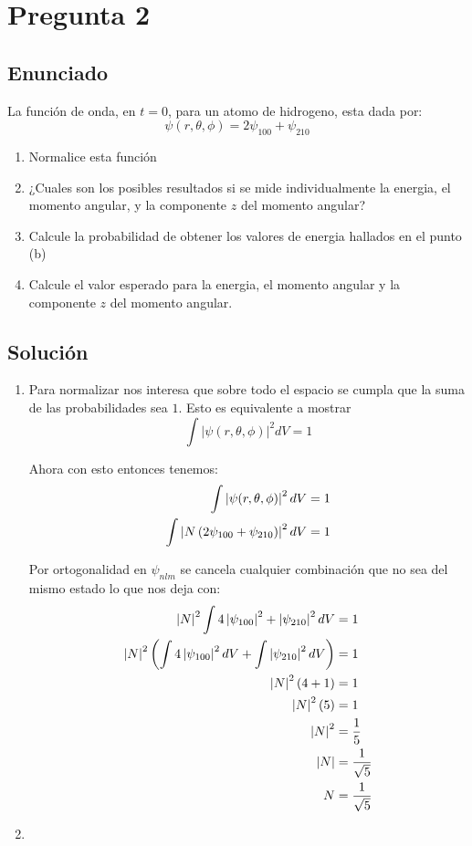 \documentclass[12pt]{exam}
\begin{document}
\section{Pregunta 2}

\subsection{Enunciado}
La función de onda, en $t = 0$, para un atomo de hidrogeno, esta dada por:
\begin{equation}
	\psi(r, \theta, \phi) = 2\psi_{100} + \psi_{210}
\end{equation}
\begin{enumerate}
	\item Normalice esta función
	\item ¿Cuales son los posibles resultados si se mide individualmente la energia, el momento angular, y la componente $z$ del momento angular?
	\item Calcule la probabilidad de obtener los valores de energia hallados en el punto (b)
	\item Calcule el valor esperado para la energia, el momento angular y la componente $z$ del momento angular.
\end{enumerate}

\subsection{Solución}
\begin{enumerate}
	\item Para normalizar nos interesa que sobre todo el espacio se cumpla que la suma de las probabilidades sea $1$. Esto es equivalente a mostrar
		\begin{equation}
			\int \left|\psi(r,\theta,\phi)\right|^2 dV = 1
		\end{equation}

		Ahora con esto entonces tenemos:
		\begin{align*}
			\int \left|\psi(r,\theta,\phi)\right|^2 dV &= 1\\
			\int \left|N\left(2\psi_{100} + \psi_{210}\right)\right|^2 dV &= 1
		\end{align*}
		
		Por ortogonalidad en $\psi_{nlm}$ se cancela cualquier combinación que no sea del mismo estado lo que nos deja con:
		\begin{align*}
			\left|N\right|^2\int 4\left|\psi_{100}\right|^2 + \left|\psi_{210}\right|^2 dV &= 1\\
			\left|N\right|^2\left(\int 4\left|\psi_{100}\right|^2 dV + \int \left|\psi_{210}\right|^2 dV\right) &= 1\\
			\left|N\right|^2\left(4 + 1\right) &= 1\\
			\left|N\right|^2\left(5\right) &= 1\\
			\left|N\right|^2 &= \frac1{5}\\
			\left|N\right| &= \frac1{\sqrt{5}}\\
			N &= \frac1{\sqrt{5}}\\
		\end{align*}
	\item 
\end{enumerate}
\break
\end{document}

